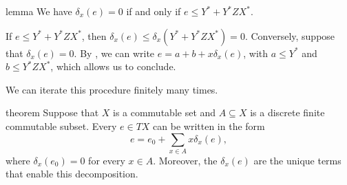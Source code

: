 \documentclass[a4paper,UKenglish,cleveref, autoref, thm-restate]{lipics-v2021}
\begin{document}
\begin{theoremEnd}{lemma}
  We have $ \delta _x(e) = 0$ if and only if $e  \leq  Y^*+Y^*ZX^*$.
\end{theoremEnd}

\begin{proofEnd}
  If $e  \leq  Y^*+Y^*ZX^*$, then $ \delta _x(e)  \leq   \delta _x(Y^*+Y^*ZX^*) = 0$.  Conversely,
  suppose that $ \delta _x(e) = 0$.  By , we
  can write $e = a + b + x \delta _x(e)$, with $a  \leq  Y^*$ and $b  \leq  Y^*ZX^*$, which
  allows us to conclude.
\end{proofEnd}

We can iterate this procedure finitely many times.

\begin{theoremEnd}{theorem}
  Suppose that $X$ is a commutable set and $A  \subseteq  X$ is a discrete finite
  commutable subset.  Every $e  \in  TX$ can be written in the form
  \[ e = e_0 +  \sum _{x  \in  A}x \delta _x(e),\] where $ \delta _x(e_0) = 0$ for every $x  \in  A$.
  Moreover, the $ \delta _x(e)$ are the unique terms that enable this decomposition.
\end{theoremEnd}
\end{document}

